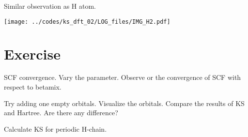 Similar observation as H atom.

{\centering
\texttt{[image: ../codes/ks\_dft\_02/LOG\_files/IMG\_H2.pdf]}
}


\section{Exercise}

SCF convergence. Vary the  parameter. Observe or the convergence
of SCF with respect to betamix.

Try adding one empty orbitals. Visualize the orbitals. Compare the results of
KS and Hartree. Are there any difference?

Calculate KS for periodic H-chain.